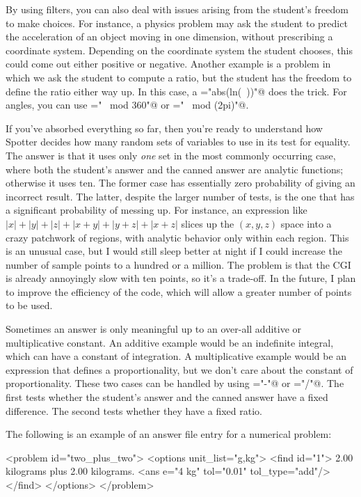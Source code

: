 \documentclass{doc}
\begin{document}
 By using filters, you can also deal with issues arising from the student's freedom
 to make choices. For instance, a physics problem may ask the student to predict
 the acceleration of an object moving in one dimension, without prescribing
 a coordinate system. Depending on the coordinate
 system the student chooses, this could come out either positive or negative.
 Another example is a problem in which we ask the student to compute a ratio,
 but the student has the freedom to define the ratio either way up. In this
 case, a \verb@filter="abs(ln(~))"@ does the trick. For angles, you can
 use \verb@filter="~ mod 360"@ or \verb@filter="~ mod (2pi)"@.

 If you've absorbed everything so far, then you're ready to understand how
 Spotter decides how many random sets of variables to use in its test for
 equality. The answer is that it uses only \emph{one} set in the most
 commonly occurring case, where both the student's answer and the canned
 answer are analytic functions; otherwise it uses ten. The former case
 has essentially zero probability of giving an incorrect result. The latter,
 despite the larger number of tests, is the one that has a significant
 probability of messing up. For instance, an expression like
 $|x|+|y|+|z|+|x+y|+|y+z|+|x+z|$ slices up the $(x,y,z)$ space into a crazy
 patchwork of regions, with analytic behavior only within each region.
 This is an unusual case, but I would still sleep better at night if I
 could increase the number of sample points to a hundred or a million.
 The problem is that the CGI is already annoyingly slow with ten points, so
 it's a trade-off. In the future, I plan to improve the efficiency of the
 code, which will allow a greater number of points to be used.

Sometimes an answer is only meaningful up to an over-all additive or multiplicative constant.
An additive example would be an indefinite integral, which can have a constant of integration.
A multiplicative example would be an expression that defines a proportionality, but we don't
care about the constant of proportionality. These two cases can be handled by using
\verb@filter="-"@ or \verb@filter="/"@. The first tests whether the student's answer and
the canned answer have a fixed difference. The second tests whether they have a fixed
ratio.

The following is an example of an answer file entry for a numerical
problem:
\begin{listing}{1}
  <problem id="two_plus_two">
    <options unit_list="g,kg">
      <find id="1">
        2.00 kilograms plus 2.00 kilograms.
        <ans e="4 kg" tol="0.01" tol_type="add"/>
      </find>
    </options>
  </problem>
\end{listing}
\end{document}
